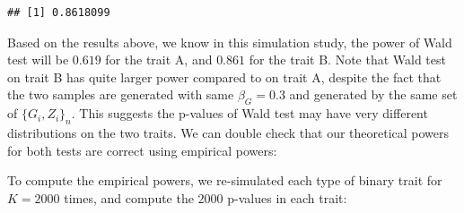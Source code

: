 \documentclass[
]{article}
\newenvironment{Shaded}{\begin{snugshade}}{\end{snugshade}}
\newcommand{\AttributeTok}[1]{\textcolor[rgb]{0.77,0.63,0.00}{#1}}
\newcommand{\ControlFlowTok}[1]{\textcolor[rgb]{0.13,0.29,0.53}{\textbf{#1}}}
\newcommand{\DecValTok}[1]{\textcolor[rgb]{0.00,0.00,0.81}{#1}}
\newcommand{\DocumentationTok}[1]{\textcolor[rgb]{0.56,0.35,0.01}{\textbf{\textit{#1}}}}
\newcommand{\FloatTok}[1]{\textcolor[rgb]{0.00,0.00,0.81}{#1}}
\newcommand{\FunctionTok}[1]{\textcolor[rgb]{0.00,0.00,0.00}{#1}}
\newcommand{\NormalTok}[1]{#1}
\newcommand{\OtherTok}[1]{\textcolor[rgb]{0.56,0.35,0.01}{#1}}
\newcommand{\SpecialCharTok}[1]{\textcolor[rgb]{0.00,0.00,0.00}{#1}}
\newcommand{\StringTok}[1]{\textcolor[rgb]{0.31,0.60,0.02}{#1}}
\begin{document}
\begin{verbatim}
## [1] 0.8618099
\end{verbatim}

Based on the results above, we know in this simulation study, the power
of Wald test will be \(0.619\) for the trait A, and \(0.861\) for the
trait B. Note that Wald test on trait B has quite larger power compared
to on trait A, despite the fact that the two samples are generated with
same \(\beta_G = 0.3\) and generated by the same set of
\(\{G_i,Z_i\}_n\). This suggests the p-values of Wald test may have very
different distributions on the two traits. We can double check that our
theoretical powers for both tests are correct using empirical powers:

To compute the empirical powers, we re-simulated each type of binary
trait for \(K = 2000\) times, and compute the \(2000\) p-values in each
trait:

\begin{Shaded}
\end{Shaded}
\end{document}
